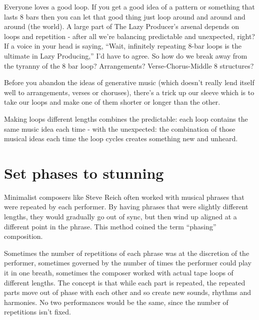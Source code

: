 \documentclass[
  12pt,
  letterpaper,
  oneside,
  open=any]{scrbook}
\begin{document}
Everyone loves a good loop. If you get a good idea of a pattern or
something that lasts 8 bars then you can let that good thing just loop
around and around and around (the world). A large part of The Lazy
Producer's arsenal depends on loops and repetition - after all we're
balancing predictable and unexpected, right? If a voice in your head is
saying, ``Wait, infinitely repeating 8-bar loops is the ultimate in Lazy
Producing,'' I'd have to agree. So how do we break away from the tyranny
of the 8 bar loop? Arrangements? Verse-Chorus-Middle 8 structures?

Before you abandon the ideas of generative music (which doesn't really
lend itself well to arrangements, verses or choruses), there's a trick
up our sleeve which is to take our loops and make one of them shorter or
longer than the other.

\begin{tcolorbox}[enhanced jigsaw, breakable, left=2mm, leftrule=.75mm, toprule=.15mm, opacitybacktitle=0.6, toptitle=1mm, coltitle=black, colback=white, colbacktitle=quarto-callout-tip-color!10!white, opacityback=0, rightrule=.15mm, bottomrule=.15mm, titlerule=0mm, title=\textcolor{quarto-callout-tip-color}{\faLightbulb}\hspace{0.5em}{Key idea}, arc=.35mm, bottomtitle=1mm, colframe=quarto-callout-tip-color-frame]

Making loops different lengths combines the predictable: each loop
contains the same music idea each time - with the unexpected: the
combination of those musical ideas each time the loop cycles creates
something new and unheard.

\end{tcolorbox}

\section{Set phases to stunning}\label{set-phases-to-stunning}

Minimalist composers like Steve Reich often worked with musical phrases
that were repeated by each performer. By having phrases that were
slightly different lengths, they would gradually go out of sync, but
then wind up aligned at a different point in the phrase. This method
coined the term ``phasing'' composition.

Sometimes the number of repetitions of each phrase was at the discretion
of the performer, sometimes governed by the number of times the
performer could play it in one breath, sometimes the composer worked
with actual tape loops of different lengths. The concept is that while
each part is repeated, the repeated parts move out of phase with each
other and so create new sounds, rhythms and harmonies. No two
performances would be the same, since the number of repetitions isn't
fixed.
\end{document}
